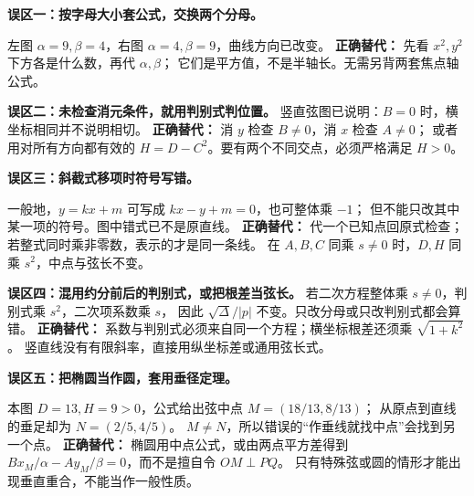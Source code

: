\clearpage
\begin{trapbox}
\textbf{误区一：按字母大小套公式，交换两个分母。}

左图 $\alpha=9,\beta=4$，右图 $\alpha=4,\beta=9$，曲线方向已改变。
\textbf{正确替代：} 先看 $x^2,y^2$ 下方各是什么数，再代 $\alpha,\beta$；
它们是平方值，不是半轴长。无需另背两套焦点轴公式。

\textbf{误区二：未检查消元条件，就用判别式判位置。}
竖直弦图已说明：$B=0$ 时，横坐标相同并不说明相切。
\textbf{正确替代：} 消 $y$ 检查 $B\ne0$，消 $x$ 检查 $A\ne0$；
或者用对所有方向都有效的 $H=D-C^2$。要有两个不同交点，必须严格满足 $H>0$。

\tcbbreak
\textbf{误区三：斜截式移项时符号写错。}

一般地，$y=kx+m$ 可写成 $kx-y+m=0$，也可整体乘 $-1$；
但不能只改其中某一项的符号。图中错式已不是原直线。
\textbf{正确替代：} 代一个已知点回原式检查；若整式同时乘非零数，表示的才是同一条线。
在 $A,B,C$ 同乘 $s\ne0$ 时，$D,H$ 同乘 $s^2$，中点与弦长不变。

\textbf{误区四：混用约分前后的判别式，或把根差当弦长。}
若二次方程整体乘 $s\ne0$，判别式乘 $s^2$，二次项系数乘 $s$，
因此 $\sqrt\Delta/|p|$ 不变。只改分母或只改判别式都会算错。
\textbf{正确替代：} 系数与判别式必须来自同一个方程；横坐标根差还须乘 $\sqrt{1+k^2}$。
竖直线没有有限斜率，直接用纵坐标差或通用弦长式。

\tcbbreak
\textbf{误区五：把椭圆当作圆，套用垂径定理。}

本图 $D=13,H=9>0$，公式给出弦中点 $M=(18/13,8/13)$；
从原点到直线的垂足却为 $N=(2/5,4/5)$。
$M\ne N$，所以错误的“作垂线就找中点”会找到另一个点。
\textbf{正确替代：} 椭圆用中点公式，或由两点平方差得到
$Bx_M/\alpha-Ay_M/\beta=0$，而不是擅自令 $OM\perp PQ$。
只有特殊弦或圆的情形才能出现垂直重合，不能当作一般性质。
\end{trapbox}
